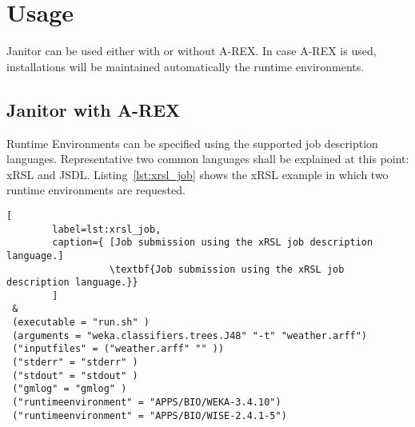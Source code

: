 \chapter{Usage}

Janitor can be used either with or without A-REX. In case A-REX is used, installations will be maintained automatically the runtime environments.

\section{Janitor with A-REX}

Runtime Environments can be specified using the supported job description languages.
Representative two common languages shall be explained at this point: xRSL and JSDL.
Listing~\ref{lst:xrsl_job} shows the xRSL example in which two runtime environments are requested.

\begin{lstlisting}[
        label=lst:xrsl_job,
        caption={ [Job submission using the xRSL job description language.]
                  \textbf{Job submission using the xRSL job description language.}}
        ]
 &
 (executable = "run.sh" )
 (arguments = "weka.classifiers.trees.J48" "-t" "weather.arff")
 ("inputfiles" = ("weather.arff" "" ))
 ("stderr" = "stderr" )
 ("stdout" = "stdout" )
 ("gmlog" = "gmlog" )
 ("runtimeenvironment" = "APPS/BIO/WEKA-3.4.10")
 ("runtimeenvironment" = "APPS/BIO/WISE-2.4.1-5")
\end{lstlisting}

